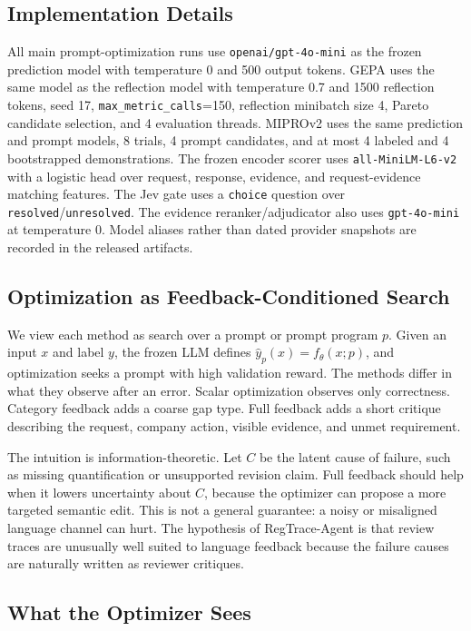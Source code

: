\documentclass[11pt]{article}
\newcommand{\framework}{RegTrace-Agent}
\begin{document}
\subsection{Implementation Details}

All main prompt-optimization runs use \texttt{openai/gpt-4o-mini} as the frozen prediction model with temperature 0 and 500 output tokens. GEPA uses the same model as the reflection model with temperature 0.7 and 1500 reflection tokens, seed 17, \texttt{max\_metric\_calls}=150, reflection minibatch size 4, Pareto candidate selection, and 4 evaluation threads. MIPROv2 uses the same prediction and prompt models, 8 trials, 4 prompt candidates, and at most 4 labeled and 4 bootstrapped demonstrations. The frozen encoder scorer uses \texttt{all-MiniLM-L6-v2} with a logistic head over request, response, evidence, and request-evidence matching features. The Jev gate uses a \texttt{choice} question over \texttt{resolved}/\texttt{unresolved}. The evidence reranker/adjudicator also uses \texttt{gpt-4o-mini} at temperature 0. Model aliases rather than dated provider snapshots are recorded in the released artifacts.

\subsection{Optimization as Feedback-Conditioned Search}

We view each method as search over a prompt or prompt program $p$. Given an input $x$ and label $y$, the frozen LLM defines $\hat{y}_{p}(x)=f_{\theta}(x;p)$, and optimization seeks a prompt with high validation reward. The methods differ in what they observe after an error. Scalar optimization observes only correctness. Category feedback adds a coarse gap type. Full feedback adds a short critique describing the request, company action, visible evidence, and unmet requirement.

The intuition is information-theoretic. Let $C$ be the latent cause of failure, such as missing quantification or unsupported revision claim. Full feedback should help when it lowers uncertainty about $C$, because the optimizer can propose a more targeted semantic edit. This is not a general guarantee: a noisy or misaligned language channel can hurt. The hypothesis of \framework{} is that review traces are unusually well suited to language feedback because the failure causes are naturally written as reviewer critiques.

\subsection{What the Optimizer Sees}
\end{document}
